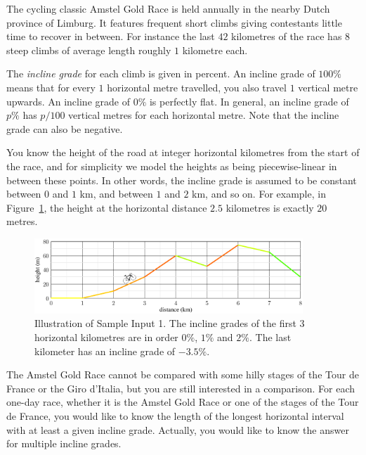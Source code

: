 
The cycling classic Amstel Gold Race is held annually in the nearby
Dutch province of Limburg. It features frequent short climbs giving
contestants little time to recover in between.  For instance the last
$42$ kilometres of the race has $8$ steep climbs of average length
roughly $1$ kilometre each.

The \emph{incline grade} for each climb is given in percent. An incline grade of $100\%$ means that for
every $1$ horizontal metre travelled, you also travel $1$ vertical metre upwards. An incline grade of $0\%$
is perfectly flat. In general, an incline grade of $p\%$ has $p / 100$ vertical metres for each
horizontal metre. Note that the incline grade can also be negative.

You know the height of the road at integer horizontal kilometres from the start
of the race, and for simplicity we model the heights as being piecewise-linear in between these
points.  In other words, the incline grade is assumed to be constant between $0$ and $1$ km, and between 
$1$ and $2$ km, and so on.  For example, in Figure~\ref{fig:profile}, the height at the horizontal
distance $2.5$ kilometres is exactly $20$ metres.

\vspace{-2mm}
\begin{figure}[h!]
  \centering
  \includegraphics[width=0.9\textwidth]{profile}
  \caption{Illustration of Sample Input 1. The incline grades of the first $3$ horizontal kilometres are
    in order $0\%$, $1\%$ and $2\%$. The last kilometer has an incline grade of $-3.5\%$.}
  \label{fig:profile}
\end{figure}
\vspace{-2mm}

The Amstel Gold Race cannot be compared with some hilly stages of the Tour de France
or the Giro d'Italia, but you are still interested in a comparison. For each one-day race, whether
it is the Amstel Gold Race or one of the stages of the Tour de France, you would like to know the length
of the longest horizontal interval with at least a given incline grade. Actually, you would like
to know the answer for multiple incline grades.

